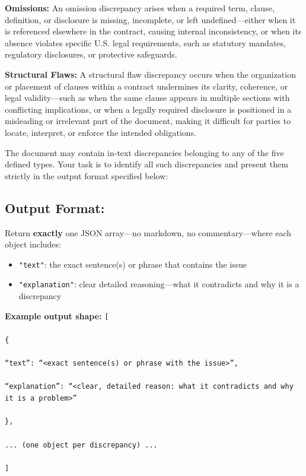 \documentclass[11pt]{article}
\begin{document}
\begin{tcolorbox}[breakable,colback=lightestgray,colframe=black,title=\textbf{Eval\_3 L1: In-Text Discrepancy Detection Prompt}]
\textbf{Omissions:}
An omission discrepancy arises when a required term, clause, definition, or disclosure is missing, incomplete, or left undefined—either when it is referenced elsewhere in the contract, causing internal inconsistency, or when its absence violates specific U.S. legal requirements, such as statutory mandates, regulatory disclosures, or protective safeguards.

\textbf{Structural Flaws:}
A structural flaw discrepancy occurs when the organization or placement of clauses within a contract undermines its clarity, coherence, or legal validity—such as when the same clause appears in multiple sections with conflicting implications, or when a legally required disclosure is positioned in a misleading or irrelevant part of the document, making it difficult for parties to locate, interpret, or enforce the intended obligations.

The document may contain in-text discrepancies belonging to any of the five defined types. Your task is to identify all such discrepancies and present them strictly in the output format specified below:

\subsection*{\textbf{Output Format:}}
Return \textbf{exactly} one JSON array—no markdown, no commentary—where each object includes:
\begin{itemize}
    \item \texttt{"text"}: the exact sentence(s) or phrase that contains the issue
    \item \texttt{"explanation"}: clear detailed reasoning—what it contradicts and why it is a discrepancy
\end{itemize}

\textbf{Example output shape:}
{\small
\texttt{[\\\\
\{\\\\
``text'': ``<exact sentence(s) or phrase with the issue>'',\\\\
``explanation'': ``<clear, detailed reason: what it contradicts and why it is a problem>''\\\\
\},\\\\
... (one object per discrepancy) ...\\\\
]}
}


\end{tcolorbox}
\end{document}
